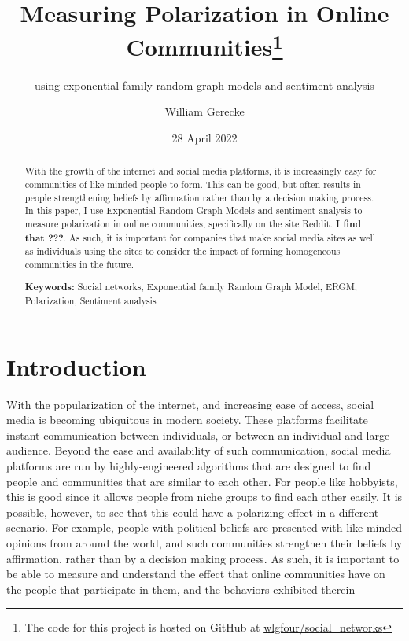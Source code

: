 \documentclass[
]{article}
\title{Measuring Polarization in Online Communities\thanks{The code for this project is hosted on GitHub at \href{https://github.com/wlgfour/social_networks}{wlgfour/social\_networks}}}
\subtitle{using exponential family random graph models and sentiment analysis}
\author{William Gerecke}
\date{28 April 2022}
\begin{document}
\maketitle
\begin{abstract}
With the growth of the internet and social media platforms, it is increasingly easy for communities of like-minded people to form. This can be good, but often results in people strengthening beliefs by affirmation rather than by a decision making process. In this paper, I use Exponential Random Graph Models and sentiment analysis to measure polarization in online communities, specifically on the site Reddit. \textbf{I find that ???}. As such, it is important for companies that make social media sites as well as individuals using the sites to consider the impact of forming homogeneous communities in the future.

\par

\textbf {Keywords:} Social networks, Exponential family Random Graph Model, ERGM, Polarization, Sentiment analysis
\end{abstract}

\newpage
\tableofcontents

\newpage

\hypertarget{introduction}{%
\section{Introduction}\label{introduction}}

With the popularization of the internet, and increasing ease of access, social media is becoming ubiquitous in modern society. These platforms facilitate instant communication between individuals, or between an individual and large audience. Beyond the ease and availability of such communication, social media platforms are run by highly-engineered algorithms that are designed to find people and communities that are similar to each other. For people like hobbyists, this is good since it allows people from niche groups to find each other easily. It is possible, however, to see that this could have a polarizing effect in a different scenario. For example, people with political beliefs are presented with like-minded opinions from around the world, and such communities strengthen their beliefs by affirmation, rather than by a decision making process. As such, it is important to be able to measure and understand the effect that online communities have on the people that participate in them, and the behaviors exhibited therein
\end{document}
